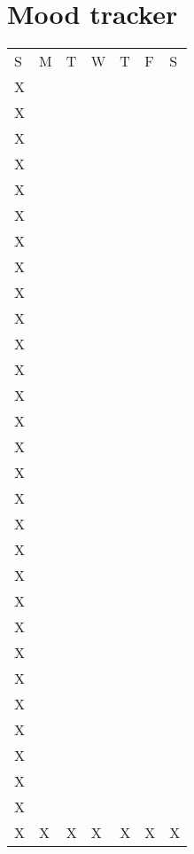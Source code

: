 \documentclass[10pt,a4paper]{article}
\begin{document}
\section{Mood tracker}
\begin{table}[htp]
\begin{tabular}{lllllll}
S & M & T & W & T & F & S \\
X &   &   &   &   &   &   \\
X &   &   &   &   &   &   \\
X &   &   &   &   &   &   \\
X &   &   &   &   &   &   \\
X &   &   &   &   &   &   \\
X &   &   &   &   &   &   \\
X &   &   &   &   &   &   \\
X &   &   &   &   &   &   \\
X &   &   &   &   &   &   \\
X &   &   &   &   &   &   \\
X &   &   &   &   &   &   \\
X &   &   &   &   &   &   \\
X &   &   &   &   &   &   \\
X &   &   &   &   &   &   \\
X &   &   &   &   &   &   \\
X &   &   &   &   &   &   \\
X &   &   &   &   &   &   \\
X &   &   &   &   &   &   \\
X &   &   &   &   &   &   \\
X &   &   &   &   &   &   \\
X &   &   &   &   &   &   \\
X &   &   &   &   &   &   \\
X &   &   &   &   &   &   \\
X &   &   &   &   &   &   \\
X &   &   &   &   &   &   \\
X &   &   &   &   &   &   \\
X &   &   &   &   &   &   \\
X &   &   &   &   &   &   \\
X &   &   &   &   &   &   \\
X & X & X & X & X & X & X
\end{tabular}
\end{table}
\newpage
\end{document}
